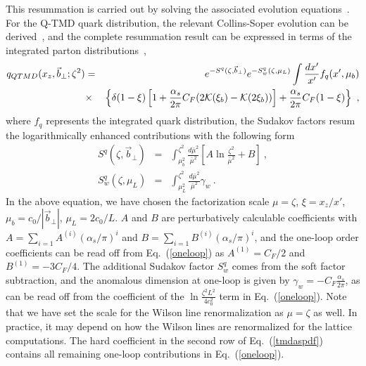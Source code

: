 \documentclass[aps,prd,preprint,tightenlines,superscriptaddress,nofootinbib]{revtex4}
\begin{document}
This resummation is carried out by solving the associated evolution
equations~\cite{Collins}. For the Q-TMD quark distribution, the relevant 
Collins-Soper evolution can be derived~\cite{Ji:2014hxa}, and the complete resummation 
result can be expressed in terms of the integrated parton distributions~\cite{Collins},
\begin{eqnarray}\label{tmdaspdf}
{q}_{QTMD}(x_z,{\vec b}_\perp;\zeta^2)&=& e^{-{ {S}^q(\zeta,{\vec b}_\perp)}}e^{-{ {S}_w^q(\zeta,\mu_L)}}\int\frac{dx'}{x'}f_q(x',\mu_b)\nonumber\\
&\times&\left\{
\delta(1-\xi)\left[1+\frac{\alpha_s}{2\pi}C_F(2{\cal K}(\xi_b)-{\cal K}(2\xi_b))\right]+\frac{\alpha_s}{2\pi}C_F(1-\xi)\right\}\ ,
\end{eqnarray}
where $f_q$ represents the integrated quark distribution, the Sudakov factors resum the logarithmically enhanced contributions with the following form
\begin{eqnarray}
S^q(\zeta,{\vec b}_\perp)&=&\int_{\mu_b^2}^{\zeta^2}\frac{d{\bar\mu}^2}{{\bar\mu}^2}\left[A\ln\frac{\zeta^2}{{\bar\mu}^2}+B\right]\ ,\\
S^q_w(\zeta,\mu_L)&=&\int_{\mu_L^2}^{\zeta^2}\frac{d{\bar\mu}^2}{{\bar\mu}^2}\gamma_w \ .
\end{eqnarray}
In the above equation, we have chosen the factorization scale $\mu=\zeta$, $\xi=x_z/x'$, $\mu_b=c_0/|{\vec b}_\perp|$, 
$\mu_L=2c_0/L$. $A$ and $B$ are perturbatively calculable coefficients with 
$A=\sum_{i=1}A^{(i)}(\alpha_s/\pi)^i$ and $B=\sum_{i=1}B^{(i)}(\alpha_s/\pi)^i$, 
and the one-loop order coefficients can be read off from Eq.~(\ref{oneloop}) as $A^{(1)}=C_F/2$ and $B^{(1)}=-3C_F/4$. The additional Sudakov factor $S_w^q$ comes from the soft factor subtraction, and the anomalous dimension at one-loop is given by $\gamma_w=-C_F\frac{\alpha_s}{2\pi}$, as can be read off from the coefficient of the $\ln\frac{\zeta^2L^2}{4c_0^2}$ term in Eq.~(\ref{oneloop}). Note that we have set the scale for the Wilson line renormalization as $\mu=\zeta$ as well. In practice, it may depend on how the Wilson
lines are renormalized for the lattice computations. The hard coefficient in the second row of Eq.~(\ref{tmdaspdf}) contains all remaining one-loop contributions in Eq.~(\ref{oneloop}).
\end{document}
